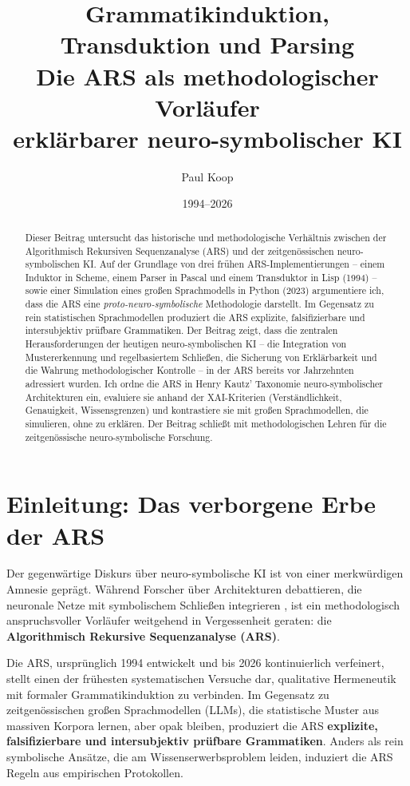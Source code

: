 \documentclass[12pt,a4paper]{article}
\title{\Huge\textbf{Grammatikinduktion, Transduktion und Parsing} \\
       \LARGE Die ARS als methodologischer Vorläufer \\
       \LARGE erklärbarer neuro-symbolischer KI}
\author{
  \large
  \begin{tabular}{c}
    Paul Koop
  \end{tabular}
}
\date{\large 1994--2026}
\begin{document}
\maketitle

\begin{abstract}
Dieser Beitrag untersucht das historische und methodologische Verhältnis zwischen 
der Algorithmisch Rekursiven Sequenzanalyse (ARS) und der zeitgenössischen 
neuro-symbolischen KI. Auf der Grundlage von drei frühen ARS-Implementierungen 
– einem Induktor in Scheme, einem Parser in Pascal und einem Transduktor in 
Lisp (1994) – sowie einer Simulation eines großen Sprachmodells in Python (2023) 
argumentiere ich, dass die ARS eine \textit{proto-neuro-symbolische} Methodologie 
darstellt. Im Gegensatz zu rein statistischen Sprachmodellen produziert die ARS 
explizite, falsifizierbare und intersubjektiv prüfbare Grammatiken. Der Beitrag 
zeigt, dass die zentralen Herausforderungen der heutigen neuro-symbolischen KI 
– die Integration von Mustererkennung und regelbasiertem Schließen, die Sicherung 
von Erklärbarkeit und die Wahrung methodologischer Kontrolle – in der ARS bereits 
vor Jahrzehnten adressiert wurden. Ich ordne die ARS in Henry Kautz' Taxonomie 
neuro-symbolischer Architekturen ein, evaluiere sie anhand der XAI-Kriterien 
(Verständlichkeit, Genauigkeit, Wissensgrenzen) und kontrastiere sie mit großen 
Sprachmodellen, die simulieren, ohne zu erklären. Der Beitrag schließt mit 
methodologischen Lehren für die zeitgenössische neuro-symbolische Forschung.
\end{abstract}

\newpage
\tableofcontents
\newpage

\section{Einleitung: Das verborgene Erbe der ARS}

Der gegenwärtige Diskurs über neuro-symbolische KI ist von einer merkwürdigen 
Amnesie geprägt. Während Forscher über Architekturen debattieren, die neuronale 
Netze mit symbolischem Schließen integrieren \citep{hitzler2022neuro, garcez2020neurosymbolic}, 
ist ein methodologisch anspruchsvoller Vorläufer weitgehend in Vergessenheit 
geraten: die \textbf{Algorithmisch Rekursive Sequenzanalyse (ARS)}.

Die ARS, ursprünglich 1994 entwickelt und bis 2026 kontinuierlich verfeinert, 
stellt einen der frühesten systematischen Versuche dar, qualitative Hermeneutik 
mit formaler Grammatikinduktion zu verbinden. Im Gegensatz zu zeitgenössischen 
großen Sprachmodellen (LLMs), die statistische Muster aus massiven Korpora 
lernen, aber opak bleiben, produziert die ARS \textbf{explizite, falsifizierbare 
und intersubjektiv prüfbare Grammatiken}. Anders als rein symbolische Ansätze, 
die am Wissenserwerbsproblem leiden, induziert die ARS Regeln aus empirischen 
Protokollen.
\end{document}
